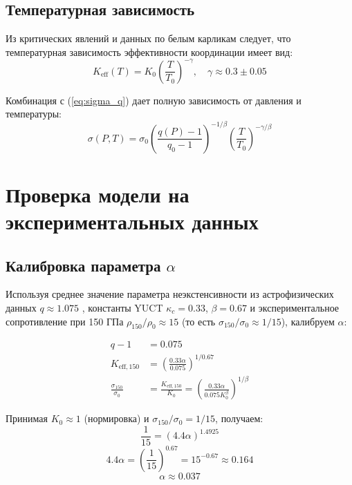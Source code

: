 \documentclass[12pt,a4paper]{article}
\theoremstyle{remark}
\newcommand{\Ke}{K_{\mathrm{eff}}}
\newcommand{\kappac}{\kappa_c}
\newcommand{\alp}{\alpha}
\begin{document}
	\subsection{Температурная зависимость}
	
	Из критических явлений и данных по белым карликам \cite{appendixP} следует, что температурная зависимость эффективности координации имеет вид:
	\begin{equation}
		\Ke(T) = K_0 \left( \frac{T}{T_0} \right)^{-\gamma}, \quad \gamma \approx 0.3 \pm 0.05
		\label{eq:keff_temp}
	\end{equation}
	
	Комбинация с (\ref{eq:sigma_q}) дает полную зависимость от давления и температуры:
	\begin{equation}
		\sigma(P,T) = \sigma_0 \left( \frac{q(P)-1}{q_0-1} \right)^{-1/\beta} \left( \frac{T}{T_0} \right)^{-\gamma/\beta}
		\label{eq:sigma_PT}
	\end{equation}
	
	\section{Проверка модели на экспериментальных данных}
	
	\subsection{Калибровка параметра \(\alp\)}
	
	Используя среднее значение параметра неэкстенсивности из астрофизических данных \(q \approx 1.075\) \cite{bertulani2015}, константы YUCT \(\kappac = 0.33\), \(\beta = 0.67\) и экспериментальное сопротивление при 150 ГПа \(\rho_{150}/\rho_0 \approx 15\) (то есть \(\sigma_{150}/\sigma_0 \approx 1/15\)), калибруем \(\alp\):
	
	\begin{align}
		q - 1 &= 0.075 \nonumber \\
		K_{\mathrm{eff},150} &= \left( \frac{0.33 \alp}{0.075} \right)^{1/0.67} \nonumber \\
		\frac{\sigma_{150}}{\sigma_0} &= \frac{K_{\mathrm{eff},150}}{K_0} = \left( \frac{0.33 \alp}{0.075 K_0^{\beta}} \right)^{1/\beta} \label{eq:calibration}
	\end{align}
	
	Принимая \(K_0 \approx 1\) (нормировка) и \(\sigma_{150}/\sigma_0 = 1/15\), получаем:
	\[
	\frac{1}{15} = \left( 4.4 \alp \right)^{1.4925}
	\]
	\[
	4.4 \alp = \left( \frac{1}{15} \right)^{0.67} = 15^{-0.67} \approx 0.164
	\]
	\[
	\alp \approx 0.037
	\]
	
\end{document}
